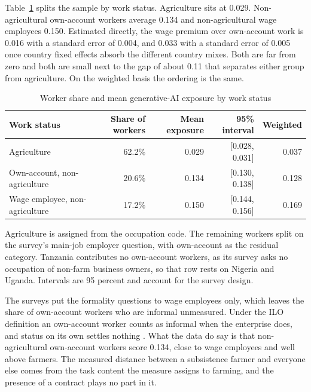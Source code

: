 Table~\ref{tab:status} splits the sample by work status. Agriculture sits
at 0.029. Non-agricultural own-account workers
average 0.134 and non-agricultural wage employees 0.150. Estimated directly, the
wage premium over own-account work is 0.016 with a standard error of 0.004, and
0.033 with a standard error of 0.005 once country fixed effects absorb the
different country mixes. Both are far from zero and both are small next to the
gap of about 0.11 that separates either group from agriculture. On the weighted
basis the ordering is the same.

\begin{table}[ht]
\centering
\caption{Worker share and mean generative-AI exposure by work status}
\label{tab:status}
\small
\begin{tabular}{lrrrr}
\toprule
Work status & Share of workers & Mean exposure & 95\% interval & Weighted \\
\midrule
Agriculture                       & 62.2\% & 0.029 & [0.028, 0.031] & 0.037 \\
Own-account, non-agriculture      & 20.6\% & 0.134 & [0.130, 0.138] & 0.128 \\
Wage employee, non-agriculture    & 17.2\% & 0.150 & [0.144, 0.156] & 0.169 \\
\bottomrule
\end{tabular}

\vspace{4pt}
\begin{minipage}{0.9\linewidth}
\footnotesize
Agriculture is assigned from the occupation code. The remaining workers split on
the survey's main-job employer question, with own-account as the residual
category. Tanzania contributes no own-account workers, as its survey asks no
occupation of non-farm business owners, so that row rests on Nigeria and Uganda.
Intervals are 95 percent and account for the survey design.
\end{minipage}
\end{table}

The surveys put the formality questions to wage employees only,
which leaves the share of own-account workers who are informal unmeasured. Under
the ILO definition an own-account worker counts as informal when the enterprise
does, and status on its own settles nothing \citep{icls2023}. What the data do
say is that non-agricultural own-account workers score 0.134, close to wage
employees and well above farmers. The measured distance between a subsistence
farmer and everyone else comes from the task content the measure assigns to
farming, and the presence of a contract plays no part in it.

